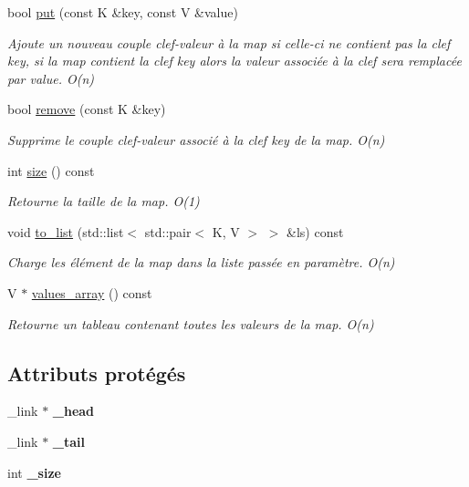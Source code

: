 \begin{DoxyCompactItemize}
bool \hyperlink{classmap_a05440e935216d8a568bff7afcb88d2f8}{put} (const K \&key, const V \&value)
\begin{DoxyCompactList}\small\item\em Ajoute un nouveau couple clef-\/valeur à la map si celle-\/ci ne contient pas la clef key, si la map contient la clef key alors la valeur associée à la clef sera remplacée par value. O(n) \end{DoxyCompactList}\item 
bool \hyperlink{classmap_ad532b9b85b9b65648d9d93bc7cbc92b1}{remove} (const K \&key)
\begin{DoxyCompactList}\small\item\em Supprime le couple clef-\/valeur associé à la clef key de la map. O(n) \end{DoxyCompactList}\item 
int \hyperlink{classmap_af151694c238aab51b431dae01d24f7ba}{size} () const 
\begin{DoxyCompactList}\small\item\em Retourne la taille de la map. O(1) \end{DoxyCompactList}\item 
void \hyperlink{classmap_a0663e8d5d6262cd61fca38ee84be22fd}{to\-\_\-list} (std\-::list$<$ std\-::pair$<$ K, V $>$ $>$ \&ls) const 
\begin{DoxyCompactList}\small\item\em Charge les élément de la map dans la liste passée en paramètre. O(n) \end{DoxyCompactList}\item 
V $\ast$ \hyperlink{classmap_ac2d929ac3f712fcf390be559cb97cafc}{values\-\_\-array} () const 
\begin{DoxyCompactList}\small\item\em Retourne un tableau contenant toutes les valeurs de la map. O(n) \end{DoxyCompactList}\end{DoxyCompactItemize}
\subsection*{Attributs protégés}
\begin{DoxyCompactItemize}
\item 
\hypertarget{classmap_a1a92ee5ddfaba8fa73113e919fe7acdd}{\-\_\-link $\ast$ {\bfseries \-\_\-head}}\label{classmap_a1a92ee5ddfaba8fa73113e919fe7acdd}

\item 
\hypertarget{classmap_ae10cd75a89a402a895642c2744df2729}{\-\_\-link $\ast$ {\bfseries \-\_\-tail}}\label{classmap_ae10cd75a89a402a895642c2744df2729}

\item 
\hypertarget{classmap_a3d1fa548df9e4bbb0fa78b250612f386}{int {\bfseries \-\_\-size}}\label{classmap_a3d1fa548df9e4bbb0fa78b250612f386}

\end{DoxyCompactItemize}


